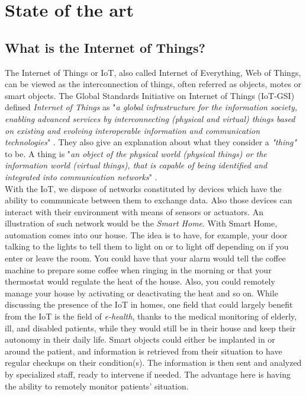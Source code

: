 \part{State of the art} \label{part:state_art}

\chapter{What is the Internet of Things?}

The Internet of Things or IoT, also called Internet of Everything, Web of Things, can be viewed as the interconnection of things, often referred as objects, motes or smart objects. The Global Standards Initiative on Internet of Things (IoT-GSI) defined \textit{Internet of Things} as "\textit{a global infrastructure for the information society, enabling advanced services by interconnecting (physical and virtual) things based on existing and evolving interoperable information and communication technologies}" \cite{ituitu}. They also give an explanation about what they consider a \textit{"thing"} to be. A thing is "\textit{an object of the physical world (physical things) or the information world (virtual things), that is capable of being identified and integrated into communication networks}" \cite{ituitu}.\\

With the IoT, we dispose of networks constituted by devices which have the ability to communicate between them to exchange data. Also those devices can interact with their environment with means of sensors or actuators. An illustration of such network would be the \textit{Smart Home}. With Smart Home, automation comes into our house. The idea is to have, for example, your door talking to the lights to tell them to light on or to light off depending on if you enter or leave the room. You could have that your alarm would tell the coffee machine to prepare some coffee when ringing in the morning or that your thermostat would regulate the heat of the house. Also, you could remotely manage your house by activating or deactivating the heat and so on. While discussing the presence of the IoT in homes, one field that could largely benefit from the IoT is the field of \textit{e-health}, thanks to the medical monitoring of elderly, ill, and disabled patients, while they would still be in their house and keep their autonomy in their daily life. Smart objects could either be implanted in or around the patient, and information is retrieved from their situation to have regular checkups on their condition(s). The information is then sent and analyzed by specialized staff, ready to intervene if needed. The advantage here is having the ability to remotely monitor patients' situation.\\

